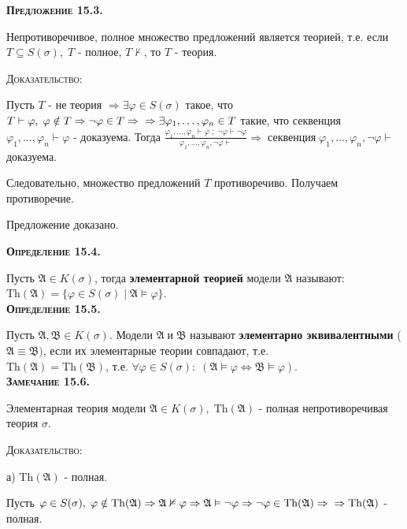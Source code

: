 \documentclass[18pt, a4paper]{extarticle}
\newcommand{\vp}{\varphi}
\newcommand{\vd}{\vdash}
\begin{document}
\textbf{\textsc{Предложение 15.3.}} 

Непротиворечивое, полное множество предложений является теорией, т.е. если $T\subseteq S(\sigma),\;T$ - полное, $T\nvdash$, то $T$ -  теория.

\textsc{Доказательство:}

Пусть $T$ -  не теория $\Rightarrow\exists\vp\in S(\sigma)$ такое, что $T\vd\vp,\;\varphi\notin T\Rightarrow\lnot\vp\in T\Rightarrow\newline\Rightarrow\exists\vp_1,\dots,\vp_n\in T$ такие, что секвенция $\vp_1,\dots,\vp_n\vd\vp$ - доказуема. Тогда
$\displaystyle \frac{\vp_1,\dots,\vp_n\vd\vp\;;\;\lnot\vp\vd\lnot\vp}{\vp_1,\dots,\vp_n,\lnot\vp\vd}\Rightarrow\;\text{секвенция}\;\vp_1,\dots,\vp_n,\lnot\vp\vd$ доказуема.

Следовательно, множество предложений $T$ противоречиво. Получаем противоречие.

Предложение доказано.

\textbf{\textsc{Определение 15.4.}} 

Пусть $\mathfrak{A}\in K(\sigma)$, тогда \textbf{элементарной теорией} модели $\mathfrak{A}$ называют: $\text{Th}(\mathfrak{A})=\{\vp\in S(\sigma)\;|\;\mathfrak{A}\vDash\vp\}$.\\

\textbf{\textsc{Определение 15.5.}} 

Пусть $\mathfrak{A},\mathfrak{B}\in K(\sigma)$. Модели $\mathfrak{A}\;\text{и}\;\mathfrak{B}$ называют \textbf{элементарно эквивалентными} ($\mathfrak{A}\equiv\mathfrak{B})$, если их элементарные теории совпадают, т.е.\\$\text{Th}(\mathfrak{A})=\text{Th}(\mathfrak{B})$, т.е. $\forall\vp\in S(\sigma):\;(\mathfrak{A}\vDash\vp\Leftrightarrow\mathfrak{B}\vDash\vp)$.\\

\textbf{\textsc{Замечание 15.6.}} 

Элементарная теория модели $\mathfrak{A}\in K(\sigma),\;\text{Th}(\mathfrak{A})$ -  полная непротиворечивая теория $\sigma$.

\textsc{Доказательство:}

а) $\text{Th}(\mathfrak{A})$ -  полная.

Пусть $\vp\in S(\sigma),\;\vp\notin \text{Th}(\mathfrak{A})\Rightarrow\mathfrak{A}\nvDash\vp\Rightarrow\mathfrak{A}\vDash\lnot\varphi\Rightarrow\lnot\vp\in \text{Th}(\mathfrak{A})\Rightarrow\newline\Rightarrow \text{Th}(\mathfrak{A})$ -  полная.
\end{document}

